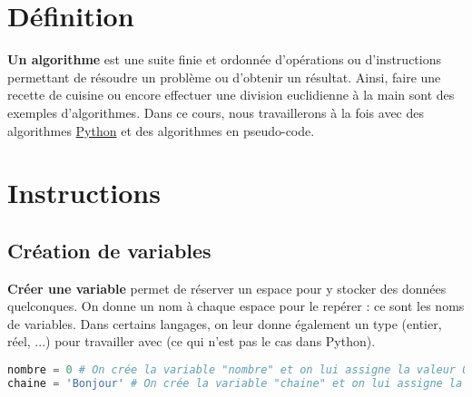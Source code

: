 


	
	
	
	
	\section{Définition}
	
	\textbf{Un algorithme} est une suite finie et ordonnée d’opérations ou d'instructions permettant de résoudre un problème ou d'obtenir un résultat. Ainsi, faire une recette de cuisine ou encore effectuer une division euclidienne à la main sont des exemples d'algorithmes.
	\newpar
	Dans ce cours, nous travaillerons à la fois avec des algorithmes \href{https://python.org}{Python} et des algorithmes en pseudo-code.
	
	\section{Instructions}
	
	\subsection{Création de variables}
	
	\textbf{Créer une variable} permet de réserver un espace pour y stocker des données quelconques.
	\newline
	On donne un nom à chaque espace pour le repérer : ce sont les noms de variables.
	Dans certains langages, on leur donne également un type (entier, réel, ...) pour travailler avec (ce qui n'est pas le cas dans Python).
	
	\begin{formula}[En python]
		\entretitreetliste
\begin{lstlisting}[language=python]
nombre = 0 # On crée la variable "nombre" et on lui assigne la valeur 0.
chaine = 'Bonjour' # On crée la variable "chaine" et on lui assigne la valeur 'Bonjour'.
\end{lstlisting}
	\end{formula}
	
